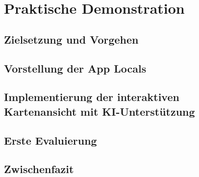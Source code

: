 \chapter{Praktische Demonstration}

\section{Zielsetzung und Vorgehen}


\section{Vorstellung der App \glqq Locals\grqq}


\section{Implementierung der interaktiven Kartenansicht mit KI-Unterstützung}


\section{Erste Evaluierung}


\section{Zwischenfazit}
